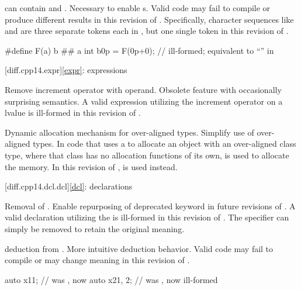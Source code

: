 \change
{} can contain   and
 .
\rationale
Necessary to enable s.
\effect
Valid \CppXIV{} code may fail to compile or produce different results in
this revision of \Cpp{}. Specifically, character sequences like 
and  are three separate tokens each in \CppXIV{}, but one single token
in this revision of \Cpp{}.
\begin{example}
\begin{codeblock}
#define F(a) b ## a
int b0p = F(0p+0);  // ill-formed; equivalent to ``\!'' in \CppXIV{}
\end{codeblock}
\end{example}

[diff.cpp14.expr]{\ref*{expr}: expressions}

\change
Remove increment operator with  operand.
\rationale
Obsolete feature with occasionally surprising semantics.
\effect
A valid \CppXIV{} expression utilizing the increment operator on
a  lvalue is ill-formed in this revision of \Cpp{}.

\change
Dynamic allocation mechanism for over-aligned types.
\rationale
Simplify use of over-aligned types.
\effect
In \CppXIV{} code that uses a 
to allocate an object with an over-aligned class type,
where that class has no allocation functions of its own,
is used to allocate the memory.
In this revision of \Cpp{},
is used instead.

[diff.cpp14.dcl.dcl]{\ref*{dcl}: declarations}

%
\change
Removal of  .
\rationale
Enable repurposing of deprecated keyword in future revisions of \Cpp{}.
\effect
A valid \CppXIV{} declaration utilizing the 
 is ill-formed in this revision of \Cpp{}.
The specifier can simply be removed to retain the original meaning.

\change
{} deduction from .
\rationale
More intuitive deduction behavior.
\effect
Valid \CppXIV{} code may fail to compile or may change meaning
in this revision of \Cpp{}.
\begin{example}
\begin{codeblock}
auto x1{1};         // was , now 
auto x2{1, 2};      // was , now ill-formed
\end{codeblock}
\end{example}

